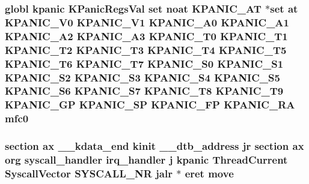 \hypertarget{mips_2entry_8S_a8e7cde31a48ccd62aababed857194696}{
\subsubsection[{mfc0}]{\setlength{\rightskip}{0pt plus 5cm}globl {\bf kpanic} {\bf K\-Panic\-Regs\-Val} set noat {\bf K\-P\-A\-N\-I\-C\-\_\-\-A\-T} $\ast$set at {\bf K\-P\-A\-N\-I\-C\-\_\-\-V0} {\bf K\-P\-A\-N\-I\-C\-\_\-\-V1} {\bf K\-P\-A\-N\-I\-C\-\_\-\-A0} {\bf K\-P\-A\-N\-I\-C\-\_\-\-A1} {\bf K\-P\-A\-N\-I\-C\-\_\-\-A2} {\bf K\-P\-A\-N\-I\-C\-\_\-\-A3} {\bf K\-P\-A\-N\-I\-C\-\_\-\-T0} {\bf K\-P\-A\-N\-I\-C\-\_\-\-T1} {\bf K\-P\-A\-N\-I\-C\-\_\-\-T2} {\bf K\-P\-A\-N\-I\-C\-\_\-\-T3} {\bf K\-P\-A\-N\-I\-C\-\_\-\-T4} {\bf K\-P\-A\-N\-I\-C\-\_\-\-T5} {\bf K\-P\-A\-N\-I\-C\-\_\-\-T6} {\bf K\-P\-A\-N\-I\-C\-\_\-\-T7} {\bf K\-P\-A\-N\-I\-C\-\_\-\-S0} {\bf K\-P\-A\-N\-I\-C\-\_\-\-S1} {\bf K\-P\-A\-N\-I\-C\-\_\-\-S2} {\bf K\-P\-A\-N\-I\-C\-\_\-\-S3} {\bf K\-P\-A\-N\-I\-C\-\_\-\-S4} {\bf K\-P\-A\-N\-I\-C\-\_\-\-S5} {\bf K\-P\-A\-N\-I\-C\-\_\-\-S6} {\bf K\-P\-A\-N\-I\-C\-\_\-\-S7} {\bf K\-P\-A\-N\-I\-C\-\_\-\-T8} {\bf K\-P\-A\-N\-I\-C\-\_\-\-T9} {\bf K\-P\-A\-N\-I\-C\-\_\-\-G\-P} {\bf K\-P\-A\-N\-I\-C\-\_\-\-S\-P} {\bf K\-P\-A\-N\-I\-C\-\_\-\-F\-P} {\bf K\-P\-A\-N\-I\-C\-\_\-\-R\-A} mfc0}}\label{mips_2entry_8S_a8e7cde31a48ccd62aababed857194696}
\hypertarget{mips_2entry_8S_aedc2f03ca41306be3ed5bee49a63b326}{
\subsubsection[{move}]{\setlength{\rightskip}{0pt plus 5cm}section ax {\bf \-\_\-\-\_\-kdata\-\_\-end} {\bf kinit} \-\_\-\-\_\-dtb\-\_\-address jr section ax org {\bf syscall\-\_\-handler} {\bf irq\-\_\-handler} j {\bf kpanic} {\bf Thread\-Current} {\bf Syscall\-Vector} {\bf S\-Y\-S\-C\-A\-L\-L\-\_\-\-N\-R} jalr $\ast$ eret move}}\label{mips_2entry_8S_aedc2f03ca41306be3ed5bee49a63b326}
